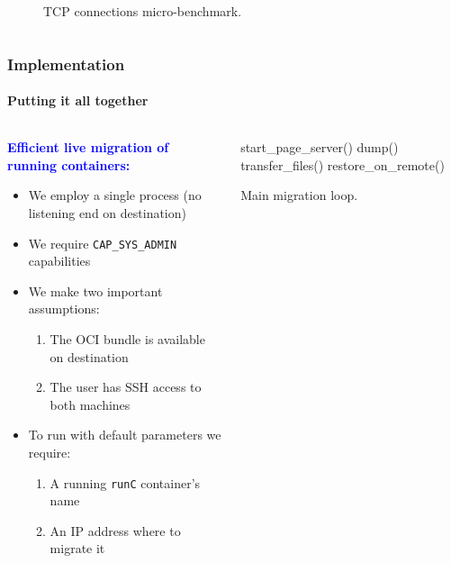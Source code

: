 \documentclass[9pt,    %
    english,            %
    xcolor=table,       %
    envcountsect,        %
    aspectratio=169     %
]{beamer}
\begin{document}
\begin{frame}
\begin{columns}
\begin{column}{.5\textwidth}
\begin{figure}
                \caption{TCP connections micro-benchmark.\label{fig:tcp-microbecnhmark}}
            \end{figure}
        \end{column}
    \end{columns}
    
\end{frame}

\begin{frame}
    \frametitle{Implementation}
    \framesubtitle{Putting it all together}

    \begin{columns}
        \begin{column}{.5\textwidth}

            \vspace{-40pt}

            \textbf{\textcolor{blue}{Efficient live migration of running containers:}}
            \begin{itemize}
                \item We employ a single process (no listening end on destination)
                \item We require \texttt{CAP\_SYS\_ADMIN} capabilities
                \item We make two important assumptions:
                \begin{enumerate}
                    \item The OCI bundle is available on destination
                    \item The user has SSH access to both machines 
                \end{enumerate}
                \item To run with default parameters we require:
                \begin{enumerate}
                    \item A running \texttt{runC} container's name
                    \item An IP address where to migrate it
                \end{enumerate}
            \end{itemize}
        \end{column}
        \begin{column}{.5\textwidth}
            \begin{algorithm2e}[H]
                \SetAlgoLined
                start\_page\_server()\;
                dump()\;
                transfer\_files()\;
                restore\_on\_remote()\;
                \caption{Main migration loop.}
            \end{algorithm2e}
        \end{column}
    \end{columns}
    
\end{frame}
\end{document}
